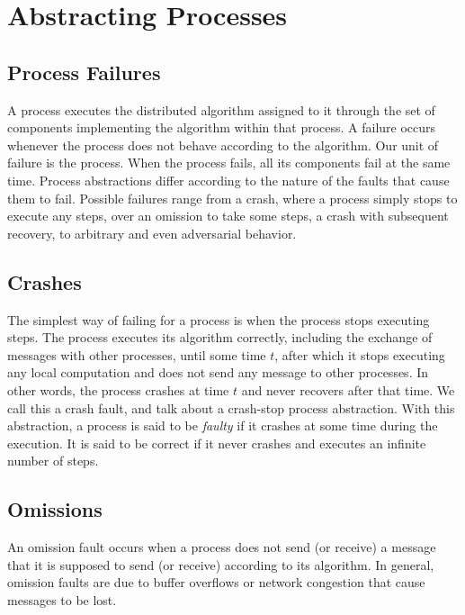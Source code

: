 \documentclass{book}
\begin{document}
\section{Abstracting Processes}
\subsection{Process Failures}
A process executes the distributed algorithm assigned to it through the set of components implementing the algorithm within that process. A failure occurs whenever
the process does not behave according to the algorithm. Our unit of failure is the
process. When the process fails, all its components fail at the same time.
Process abstractions differ according to the nature of the faults that cause them
to fail. Possible failures range from a crash, where a process simply stops to execute
any steps, over an omission to take some steps, a crash with subsequent recovery,
to arbitrary and even adversarial behavior.

\subsection{Crashes}
The simplest way of failing for a process is when the process stops executing steps.
The process executes its algorithm correctly, including the exchange of messages with other processes, until some time $t$, after which it stops executing any local computation and does not send any message to other processes.
In other words, the process crashes at time $t$ and never recovers after that time.
We call this a crash fault, and talk about a crash-stop process abstraction.
With this abstraction, a process is said to be \textit{faulty} if it crashes at some time during the execution.
It is said to be correct if it never crashes and executes an infinite number of steps.

\subsection{Omissions}
An omission fault occurs when a process does not send (or receive) a message that it is supposed to send (or receive) according to its algorithm.
In general, omission faults are due to buffer overflows or network congestion that cause messages to be lost.
\end{document}
